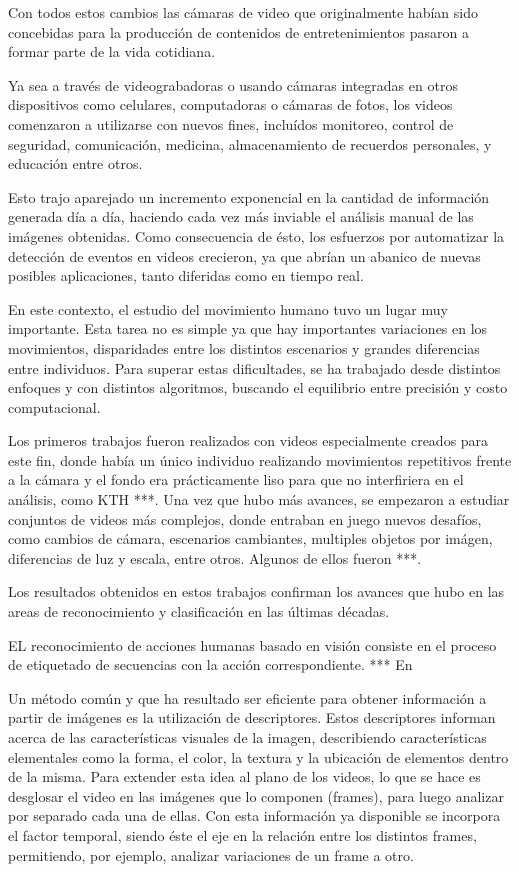 Con todos estos cambios las cámaras de video que originalmente habían sido concebidas para la producción de contenidos de entretenimientos pasaron a
formar parte de la vida cotidiana.

Ya sea a través de videograbadoras o usando cámaras integradas en otros dispositivos como celulares, computadoras o cámaras de fotos, los videos
comenzaron a utilizarse con nuevos fines, incluídos monitoreo, control de seguridad, comunicación, medicina, almacenamiento de recuerdos personales,
y educación entre otros.

Esto trajo aparejado un incremento exponencial en la cantidad de información generada día a día, haciendo cada vez más inviable el análisis manual de
las imágenes obtenidas. Como consecuencia de ésto, los esfuerzos por automatizar la detección de eventos en videos crecieron, ya que abrían un abanico
de nuevas posibles aplicaciones, tanto diferidas como en tiempo real.

En este contexto, el estudio del movimiento humano tuvo un lugar muy importante. Esta tarea no es simple ya que hay importantes variaciones en los
movimientos, disparidades entre los distintos escenarios y grandes diferencias entre individuos. Para superar estas dificultades, se ha trabajado
desde distintos enfoques y con distintos algoritmos, buscando el equilibrio entre precisión y costo computacional.

Los primeros trabajos fueron realizados con videos especialmente creados para este fin, donde había un único individuo realizando movimientos repetitivos
frente a la cámara y el fondo era prácticamente liso para que no interfiriera en el análisis,  como KTH ***. Una vez que hubo más avances, se empezaron a
estudiar conjuntos de videos más complejos, donde entraban en juego nuevos desafíos, como cambios de cámara, escenarios cambiantes, multiples objetos por
imágen, diferencias de luz y escala, entre otros. Algunos de ellos fueron ***.

Los resultados obtenidos en estos trabajos confirman los avances que hubo en las areas de reconocimiento y clasificación en las últimas décadas.




EL reconocimiento de acciones humanas basado en visión consiste en el
proceso de etiquetado de secuencias con la acción correspondiente. *** En 


Un método común y que ha resultado ser eficiente para obtener información a partir de imágenes es la utilización de descriptores.
Estos descriptores informan acerca de las características visuales de la imagen, describiendo características elementales como la forma, el color,
la textura y la ubicación de elementos dentro de la misma.
Para extender esta idea al plano de los videos, lo que se hace es desglosar el video en las imágenes que lo componen (frames), para luego analizar por separado
cada una de ellas. Con esta información ya disponible se incorpora el factor temporal, siendo éste el eje en la relación entre los distintos frames, permitiendo,
por ejemplo, analizar variaciones de un frame a otro.
